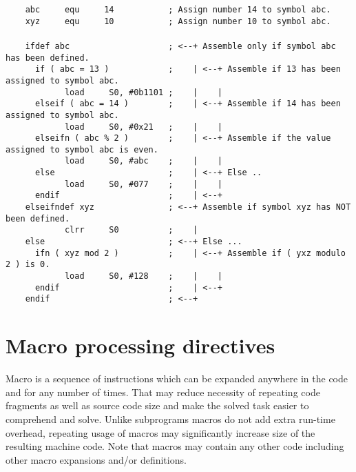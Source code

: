        {
            \fontsize{8pt}{10pt}\selectfont
            \verb'    abc     equ     14           ; Assign number 14 to symbol abc.'\\
            \verb'    xyz     equ     10           ; Assign number 10 to symbol abc.'\\
            \verb''\\
            \verb'    ifdef abc                    ; <--+ Assemble only if symbol abc has been defined.'\\
            \verb'      if ( abc = 13 )            ;    | <--+ Assemble if 13 has been assigned to symbol abc.'\\
            \verb'            load     S0, #0b1101 ;    |    |'\\
            \verb'      elseif ( abc = 14 )        ;    | <--+ Assemble if 14 has been assigned to symbol abc.'\\
            \verb'            load     S0, #0x21   ;    |    |'\\
            \verb'      elseifn ( abc % 2 )        ;    | <--+ Assemble if the value assigned to symbol abc is even.'\\
            \verb'            load     S0, #abc    ;    |    |'\\
            \verb'      else                       ;    | <--+ Else ..'\\
            \verb'            load     S0, #077    ;    |    |'\\
            \verb'      endif                      ;    | <--+'\\
            \verb'    elseifndef xyz               ; <--+ Assemble if symbol xyz has NOT been defined.'\\
            \verb'            clrr     S0          ;    |'\\
            \verb'    else                         ; <--+ Else ...'\\
            \verb'      ifn ( xyz mod 2 )          ;    | <--+ Assemble if ( yxz modulo 2 ) is 0.'\\
            \verb'            load     S0, #128    ;    |    |'\\
            \verb'      endif                      ;    | <--+'\\
            \verb'    endif                        ; <--+'
        }

\clearpage
\section{Macro processing directives}
    Macro is a sequence of instructions which can be expanded anywhere in the code and for any number of times. That may reduce necessity of repeating code fragments as well as source code size and make the solved task easier to comprehend and solve. Unlike subprograms macros do not add extra run-time overhead, repeating usage of macros may significantly increase size of the resulting machine code. Note that macros may contain any other code including other macro expansions and/or definitions.

